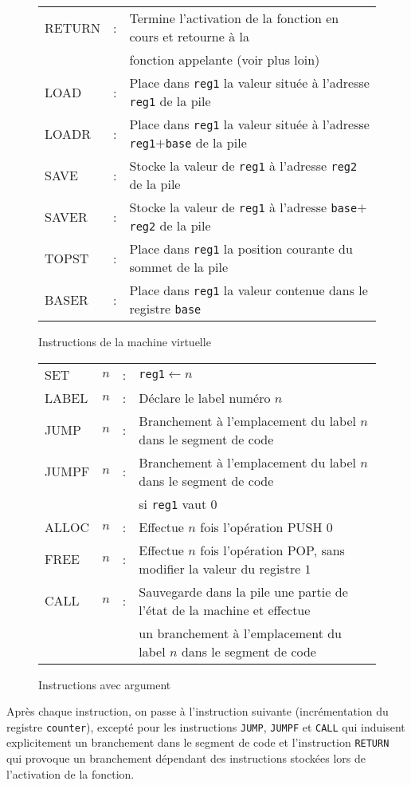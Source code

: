 \documentclass[12pt,a4paper]{article}
\begin{document}
\begin{figure}
\begin{tabular}{lll}
    RETURN&:& Termine l'activation de la fonction en cours
    et retourne à la\\&& fonction appelante (voir plus loin)\\
    LOAD &:& Place dans \texttt{reg1} la valeur située à l'adresse \texttt{reg1}
    de la pile\\
    LOADR &:& Place dans \texttt{reg1} la valeur située à l'adresse
    \texttt{reg1}$+$\texttt{base} de la pile\\
    SAVE &:& Stocke la valeur de \texttt{reg1} à l'adresse \texttt{reg2} de la pile\\
    SAVER&:& Stocke la valeur de \texttt{reg1} à l'adresse \texttt{base}$+$\texttt{reg2} de la pile\\
    TOPST &:& Place dans \texttt{reg1} la position courante du sommet de la pile\\
    BASER &:& Place dans \texttt{reg1} la valeur contenue dans le registre \texttt{base}\\
  \end{tabular}
  \caption{Instructions de la machine virtuelle}
  \label{fig:instruct}
\end{figure}

\begin{figure}
  \centering
  \begin{tabular}{llll}
    SET   &$n$&:& \texttt{reg1}$\leftarrow n$\\
    LABEL &$n$&:& Déclare le label numéro $n$\\
    JUMP  &$n$&:& Branchement à l'emplacement du label $n$ dans le segment de code\\
    JUMPF &$n$&:& Branchement à l'emplacement du label $n$ dans le segment de code\\
    &&& si \texttt{reg1} vaut $0$\\
    ALLOC &$n$&:& Effectue $n$ fois l'opération PUSH $0$ \\
    FREE  &$n$&:& Effectue $n$ fois l'opération POP, sans modifier la valeur du registre $1$\\
    CALL  &$n$&:& Sauvegarde dans la pile une partie de l'état de la machine et effectue \\
    &&& un branchement à l'emplacement du label $n$ dans le segment de code\\
  \end{tabular}
  \caption{Instructions avec argument}
\label{fig:instructarg}
\end{figure}

Après chaque instruction, on passe à l'instruction suivante
(incrémentation du registre \texttt{counter}), excepté
pour les instructions \texttt{JUMP}, \texttt{JUMPF} et \texttt{CALL} qui
induisent explicitement un branchement dans le segment de code
et l'instruction \texttt{RETURN} qui provoque un branchement dépendant
des instructions stockées lors de l'activation de la fonction.
\end{document}

